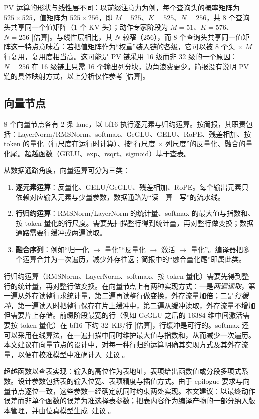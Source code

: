\documentclass[a4paper,10.5pt]{ctexart}
\newcommand{\tE}{\textsf{[估算]}}           %
\newcommand{\tR}{\textsf{[建议]}}           %
\begin{document}
PV 运算的形状与线性层不同：以前缀注意力为例，每个查询头的概率矩阵为 $525\times525$，值矩阵为 $525\times256$，即 $M=525$、$K=525$、$N=256$，共 8 个查询头共享同一个值矩阵（1 个 KV 头）；动作专家阶段为 $M=51$、$K=576$、$N=256$ \tE。与线性层相比，其 $N$ 较窄（256），而 8 个查询头共享同一值矩阵这一特点意味着：若把值矩阵作为“权重”装入链的各级，它可以被 8 个头 $\times$ $M$ 行复用，复用度相当高。这可能是 PV 链采用 16 级而非 32 级的一个原因：$N=256$ 在 16 级链上只需 16 个输出列分块，边角浪费更少。简报没有说明 PV 链的具体映射方式，以上分析仅作参考 \tE。

\subsection{向量节点}\label{sec:vector}

8 个向量节点各有 2 条 lane，以 bf16 执行逐元素与归约运算。按简报，其职责包括：LayerNorm/RMSNorm、softmax、GeGLU、GELU、RoPE、残差相加、按 token 的量化（行尺度在运行时计算）、按“行尺度 $\times$ 列尺度”的反量化、融合的量化尾。超越函数（GELU、exp、rsqrt、sigmoid）基于查表。

从数据通路角度，向量运算可分为三类：
\begin{enumerate}
  \item \textbf{逐元素运算}：反量化、GELU/GeGLU、残差相加、RoPE。每个输出元素只依赖对应输入元素与少量参数，数据通路为“读—算—写”的流水线。
  \item \textbf{行归约运算}：RMSNorm/LayerNorm 的统计量、softmax 的最大值与指数和、按 token 量化的行尺度。需要先扫描整行得到统计量，再对整行做变换；数据通路需要行缓冲或两遍读取。
  \item \textbf{融合序列}：例如“归一化 $\to$ 量化”“反量化 $\to$ 激活 $\to$ 量化”。编译器把多个运算合并为一次遍历，减少外存往返；简报中的“融合量化尾”即属此类。
\end{enumerate}

行归约运算（RMSNorm、LayerNorm、softmax、按 token 量化）需要先得到整行的统计量，再对整行做变换。在向量节点上有两种实现方式：一是\emph{两遍读取}，第一遍从外存读整行求统计量，第二遍再读整行做变换，外存流量加倍；二是\emph{行缓冲}，第一遍读入时把整行保存在片上缓冲中，第二遍从缓冲读取，外存流量不增加但需要片上存储。前缀阶段最宽的行（例如 GeGLU 之后的 16384 维中间激活需要按 token 量化）在 bf16 下约 32~KB/行 \tE，行缓冲是可行的。softmax 还可以采用在线算法，在一遍扫描中同时维护最大值与指数和，从而减少一次遍历。本文建议在向量节点的设计中，对每一种行归约运算明确其实现方式及其外存流量，以便在校准模型中准确计入 \tR。

超越函数以查表实现：输入的高位作为表地址，表项给出函数值或分段多项式系数。设计参数包括表的输入位宽、表项精度与插值方式。由于 epilogue 要求与向量节点逐位一致，这些参数一经确定就同时约束两处实现。本文建议：以最终动作误差而非单个函数的误差为准选择表参数；把表内容作为编译产物的一部分纳入版本管理，并由位真模型生成 \tR。
\end{document}
